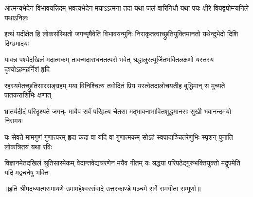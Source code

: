\fourlineindentedshloka
{आत्मन्यभेदेन विभावयन्निदम्}
{भवत्यभेदेन मयाऽऽत्मना तदा}
{यथा जलं वारिनिधौ यथा पयः}
{क्षीरे वियद्व्योम्न्यनिले यथाऽनिलः} %

\fourlineindentedshloka
{इत्थं यदीक्षेत हि लोकसंस्थितो}
{जगन्मृषैवेति विभावयन्मुनिः}
{निराकृतत्वाच्छ्रुतियुक्तिमानतो}
{यथेन्दुभेदो दिशि दिग्भ्रमादयः} %

\fourlineindentedshloka
{यावन्न पश्येदखिलं मदात्मकम्}
{तावन्मदाराधनतत्परो भवेत्}
{श्रद्धालुरत्यूर्जितभक्तिलक्षणो}
{यस्तस्य दृश्योऽहमहर्निशं हृदि} %

\fourlineindentedshloka
{रहस्यमेतच्छ्रुतिसारसङ्ग्रहम्}
{मया विनिश्चित्य तवोदितं प्रिय}
{यस्त्वेतदालोचयतीह बुद्धिमान्}
{स मुच्यते पातकराशिभिः क्षणात्} %

\fourlineindentedshloka
{भ्रातर्यदीदं परिदृश्यते जगन्-}
{मायैव सर्वं परिहृत्य चेतसा}
{मद्भावनाभावितशुद्धमानसः}
{सुखी भवानन्दमयो निरामयः} %

\fourlineindentedshloka
{यः सेवते मामगुणं गुणात्परम्}
{हृदा कदा वा यदि वा गुणात्मकम्}
{सोऽहं स्वपादाञ्चितरेणुभिः स्पृशन्}
{पुनाति लोकत्रितयं यथा रविः} %

\fourlineindentedshloka
{विज्ञानमेतदखिलं श्रुतिसारमेकम्}
{वेदान्तवेद्यचरणेन मयैव गीतम्}
{यः श्रद्धया परिपठेद्गुरुभक्तियुक्तो}
{मद्रूपमेति यदि मद्वचनेषु भक्तिः} %

{॥इति श्रीमदध्यात्मरामायणे उमामहेश्वरसंवादे उत्तरकाण्डे पञ्चमे  सर्गे
रामगीता सम्पूर्णा॥}
